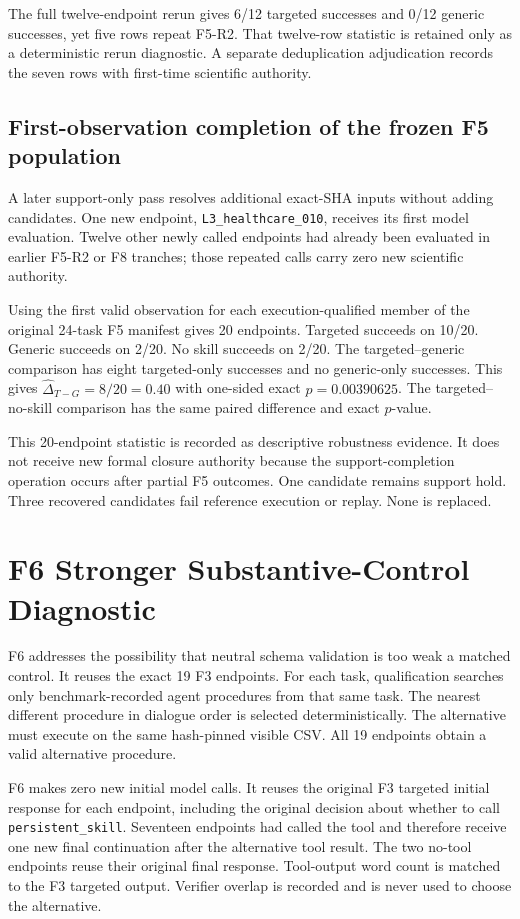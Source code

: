 The full twelve-endpoint rerun gives 6/12 targeted successes and 0/12 generic successes, yet five rows repeat F5-R2. That twelve-row statistic is retained only as a deterministic rerun diagnostic. A separate deduplication adjudication records the seven rows with first-time scientific authority.

\subsection{First-observation completion of the frozen F5 population}
A later support-only pass resolves additional exact-SHA inputs without adding candidates. One new endpoint, \texttt{L3\_healthcare\_010}, receives its first model evaluation. Twelve other newly called endpoints had already been evaluated in earlier F5-R2 or F8 tranches; those repeated calls carry zero new scientific authority.

Using the first valid observation for each execution-qualified member of the original 24-task F5 manifest gives 20 endpoints. Targeted succeeds on 10/20. Generic succeeds on 2/20. No skill succeeds on 2/20. The targeted--generic comparison has eight targeted-only successes and no generic-only successes. This gives $\widehat{\Delta}_{T-G}=8/20=0.40$ with one-sided exact $p=0.00390625$. The targeted--no-skill comparison has the same paired difference and exact $p$-value.

This 20-endpoint statistic is recorded as descriptive robustness evidence. It does not receive new formal closure authority because the support-completion operation occurs after partial F5 outcomes. One candidate remains support hold. Three recovered candidates fail reference execution or replay. None is replaced.

\section{F6 Stronger Substantive-Control Diagnostic}
\label{app:f6}
F6 addresses the possibility that neutral schema validation is too weak a matched control. It reuses the exact 19 F3 endpoints. For each task, qualification searches only benchmark-recorded agent procedures from that same task. The nearest different procedure in dialogue order is selected deterministically. The alternative must execute on the same hash-pinned visible CSV. All 19 endpoints obtain a valid alternative procedure.

F6 makes zero new initial model calls. It reuses the original F3 targeted initial response for each endpoint, including the original decision about whether to call \texttt{persistent\_skill}. Seventeen endpoints had called the tool and therefore receive one new final continuation after the alternative tool result. The two no-tool endpoints reuse their original final response. Tool-output word count is matched to the F3 targeted output. Verifier overlap is recorded and is never used to choose the alternative.

